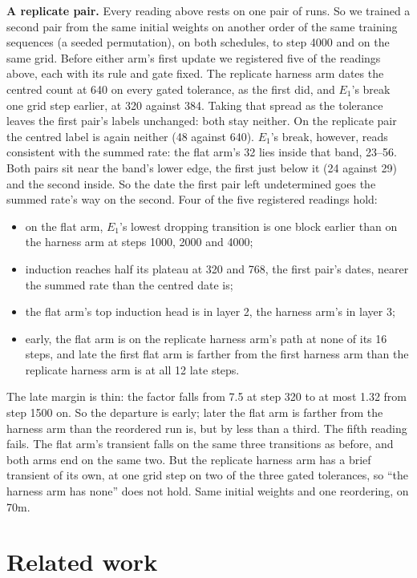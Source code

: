 \documentclass[11pt]{article}
\begin{document}
\textbf{A replicate pair.} Every reading above rests on one pair of runs. So we trained a second pair from the same initial weights on another order of the same training sequences (a seeded permutation), on both schedules, to step 4000 and on the same grid. Before either arm's first update we registered five of the readings above, each with its rule and gate fixed. The replicate harness arm dates the centred count at 640 on every gated tolerance, as the first did, and $E_{1}$'s break one grid step earlier, at 320 against 384. Taking that spread as the tolerance leaves the first pair's labels unchanged: both stay neither. On the replicate pair the centred label is again neither (48 against 640). $E_{1}$'s break, however, reads consistent with the summed rate: the flat arm's 32 lies inside that band, 23--56. Both pairs sit near the band's lower edge, the first just below it (24 against 29) and the second inside. So the date the first pair left undetermined goes the summed rate's way on the second. Four of the five registered readings hold:
\begin{itemize}
\item on the flat arm, $E_{1}$'s lowest dropping transition is one block earlier than on the harness arm at steps 1000, 2000 and 4000;
\item induction reaches half its plateau at 320 and 768, the first pair's dates, nearer the summed rate than the centred date is;
\item the flat arm's top induction head is in layer 2, the harness arm's in layer 3;
\item early, the flat arm is on the replicate harness arm's path at none of its 16 steps, and late the first flat arm is farther from the first harness arm than the replicate harness arm is at all 12 late steps.
\end{itemize}
The late margin is thin: the factor falls from 7.5 at step 320 to at most 1.32 from step 1500 on. So the departure is early; later the flat arm is farther from the harness arm than the reordered run is, but by less than a third. The fifth reading fails. The flat arm's transient falls on the same three transitions as before, and both arms end on the same two. But the replicate harness arm has a brief transient of its own, at one grid step on two of the three gated tolerances, so ``the harness arm has none'' does not hold. Same initial weights and one reordering, on 70m.

\section{Related work}\label{sec:8}
\end{document}
